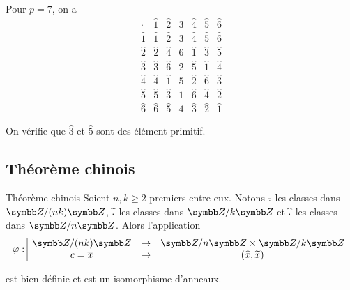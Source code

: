 \begin{exemple}
    Pour $p = 7$, on a 
    \[
        \begin{array}{c|cccccc}
            \cdot & \widehat{1} & \widehat{2} & \widehat{3} & \widehat{4} & \widehat{5} & \widehat{6} \\
            \hline
            \widehat{1} & \widehat{1} & \widehat{2} & \widehat{3} & \widehat{4} & \widehat{5} & \widehat{6} \\
            \widehat{2} & \widehat{2} & \widehat{4} & \widehat{6} & \widehat{1} & \widehat{3} & \widehat{5} \\
            \widehat{3} & \widehat{3} & \widehat{6} & \widehat{2} & \widehat{5} & \widehat{1} & \widehat{4} \\
            \widehat{4} & \widehat{4} & \widehat{1} & \widehat{5} & \widehat{2} & \widehat{6} & \widehat{3} \\
            \widehat{5} & \widehat{5} & \widehat{3} & \widehat{1} & \widehat{6} & \widehat{4} & \widehat{2} \\
            \widehat{6} & \widehat{6} & \widehat{5} & \widehat{4} & \widehat{3} & \widehat{2} & \widehat{1} 
        \end{array}
    \]

    On vérifie que $\widehat 3$ et $\widehat 5$ sont des élément primitif.
\end{exemple}

\subsection{Théorème chinois}

\begin{theoreme}{Théorème chinois}{}
    Soient $n, k \geqslant 2$ premiers entre eux. Notons $\overline{.} \space $ les 
    classes dans $\Z / (n k) \Z$, $\widetilde{.}\space $ les classes dans $\Z / k \Z$ et 
    $\space \widehat{.} \space $ les classes dans $\Z / n \Z$.
    Alors l'application 
    \[\fonction{\varphi}{\Z / (n k) \Z}{\Z / n \Z \times \Z / k \Z}{c = \overline x}{(\widehat x, \widetilde x)}\]

    est bien définie et est un isomorphisme d'anneaux.
\end{theoreme}

